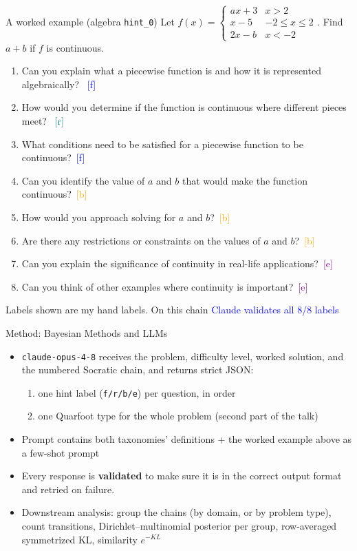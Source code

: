 \documentclass[10pt,aspectratio=169]{beamer}
\newcommand{\good}[1]{\textcolor{blue}{#1}}
\newcommand{\hf}{\textcolor{blue}{[f]}}
\newcommand{\hr}{\textcolor{teal}{[r]}}
\newcommand{\hb}{\textcolor{orange}{[b]}}
\newcommand{\he}{\textcolor{purple}{[e]}}
\begin{document}
\begin{frame}{A worked example (algebra \texttt{hint\_0})}
  \small
  Let
  $f(x)=\begin{cases} ax+3 & x>2\\ x-5 & -2\le x\le 2\\ 2x-b & x<-2 \end{cases}$.
  \quad Find $a+b$ if $f$ is continuous.
  \medskip
  \begin{enumerate}\footnotesize
    \item Can you explain what a piecewise function is and how it is represented algebraically? \pause ~\hf \pause 
    \item How would you determine if the function is continuous where different pieces meet? \pause ~\hr \pause 
    \item What conditions need to be satisfied for a piecewise function to be continuous?\pause ~\hf \pause 
    \item Can you identify the value of $a$ and $b$ that would make the function continuous?\pause ~\hb \pause 
    \item How would you approach solving for $a$ and $b$?\pause ~\hb \pause 
    \item Are there any restrictions or constraints on the values of $a$ and $b$?\pause ~\hb \pause 
    \item Can you explain the significance of continuity in real-life applications?\pause ~\he \pause 
    \item Can you think of other examples where continuity is important?\pause ~\he \pause 
  \end{enumerate}
  \medskip
  \normalsize
  Labels shown are my hand labels. On this chain
  \good{Claude validates all 8/8 labels }
\end{frame}


\begin{frame}{Method: Bayesian Methods and LLMs}
  \begin{itemize}
    \item \texttt{claude-opus-4-8} receives the problem, difficulty level, worked solution, and the numbered Socratic chain, and returns strict JSON: \pause 
    \begin{enumerate}
      \item one hint label (\texttt{f/r/b/e}) per question, in order \pause 
      \item one Quarfoot type for the whole problem (second part of the talk)
    \end{enumerate} \pause 
    \item Prompt contains both taxonomies' definitions + the worked example above as a few-shot prompt  \pause 
    \item Every response is \textbf{validated} to make sure it is in the correct output format and retried on failure. \pause 
    \item Downstream analysis: group the chains (by domain, or by problem type), count
          transitions, Dirichlet--multinomial posterior per group, row-averaged
          symmetrized KL, similarity $e^{-KL}$
  \end{itemize}
\end{frame}
\end{document}
